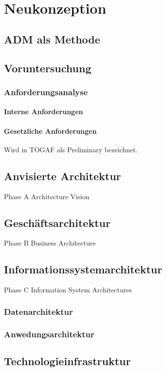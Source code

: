 \chapter{Neukonzeption}

\section{ADM als Methode}

\section{Voruntersuchung}
\subsection{Anforderungsanalyse}
\subsubsection{Interne Anforderungen}
\subsubsection{Gesetzliche Anforderungen}

Wird in TOGAF als Preliminary bezeichnet.

\section{Anvisierte Architektur}
Phase A Architecture Vision
\section{Geschäftsarchitektur}
Phase B Business Architecture

\section{Informationssystemarchitektur}
Phase C Information System Architectures

\subsection{Datenarchitektur}

\subsection{Anwedungsarchitektur}

\section{Technologieinfrastruktur}